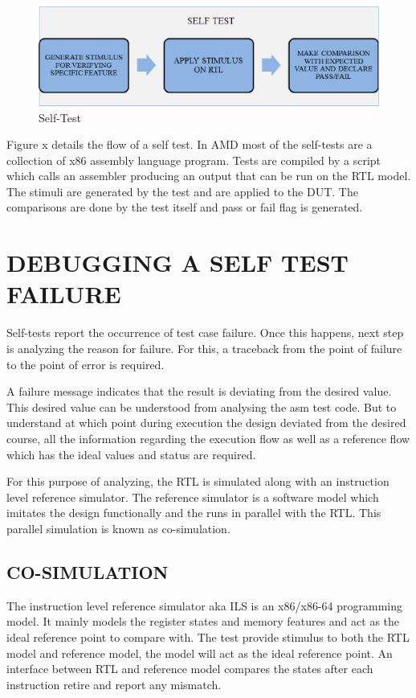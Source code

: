 \begin{figure}[H]
\centering
\includegraphics[width=5.5in]{./figures/selftest.eps}
\caption{Self-Test} 
\label{fig:selftest.eps}
\end{figure}

Figure x details the flow of a self test. In AMD most of the self-tests are a collection of x86 assembly language program. Tests are compiled by a script which calls an assembler producing an output that can be run on the RTL model. The stimuli are generated by the test and are applied to the DUT. The comparisons are done by the test itself and pass or fail flag is generated. \\



\section{DEBUGGING A SELF TEST FAILURE}

Self-tests report the occurrence of test case failure. Once this happens, next step is analyzing the reason for failure.  For this, a traceback from the point of failure to the point of error is required. 

A failure message indicates that the result is deviating from the desired value. This desired value can be understood from analysing the asm test code. But to understand at which point during execution the design deviated from the desired course, all the information regarding the execution flow as well as a reference flow which has the ideal values and status are required.
 
For this purpose of analyzing, the RTL is simulated along with an instruction level reference simulator. The reference simulator is a software model which imitates the design functionally and the runs in parallel with the RTL. This parallel simulation is known as co-simulation. 


\subsection {CO-SIMULATION}
The instruction level reference simulator aka ILS is an x86/x86-64 programming model. It mainly models the register states and memory features and act as the ideal reference point to compare with. The test provide stimulus to both the RTL model and reference model, the model will act as the ideal reference point. An interface between RTL and reference model compares the states after each instruction retire and report any mismatch. 

